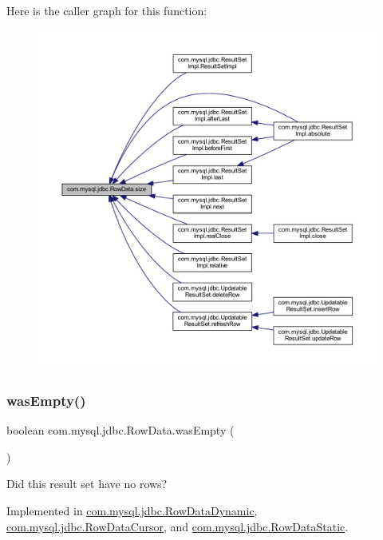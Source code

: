 Here is the caller graph for this function\+:
\nopagebreak
\begin{figure}[H]
\begin{center}
\leavevmode
\includegraphics[width=350pt]{interfacecom_1_1mysql_1_1jdbc_1_1_row_data_a7c6f91ddc0fcd7f5f12a64c7dc019995_icgraph}
\end{center}
\end{figure}
\mbox{\label{interfacecom_1_1mysql_1_1jdbc_1_1_row_data_a27df2f8d51aad5e69a5ac330a7b70aac}} 
\subsubsection{\texorpdfstring{was\+Empty()}{wasEmpty()}}
{\footnotesize\ttfamily boolean com.\+mysql.\+jdbc.\+Row\+Data.\+was\+Empty (\begin{DoxyParamCaption}{ }\end{DoxyParamCaption})}

Did this result set have no rows? 

Implemented in \mbox{\hyperlink{classcom_1_1mysql_1_1jdbc_1_1_row_data_dynamic_a40a524d57dd4356ce8ec38796ae68e38}{com.\+mysql.\+jdbc.\+Row\+Data\+Dynamic}}, \mbox{\hyperlink{classcom_1_1mysql_1_1jdbc_1_1_row_data_cursor_a1a7ddb6250de847e90a2146a01ab0f46}{com.\+mysql.\+jdbc.\+Row\+Data\+Cursor}}, and \mbox{\hyperlink{classcom_1_1mysql_1_1jdbc_1_1_row_data_static_a4f28134023a2a4521847430d3cab6cd4}{com.\+mysql.\+jdbc.\+Row\+Data\+Static}}.



